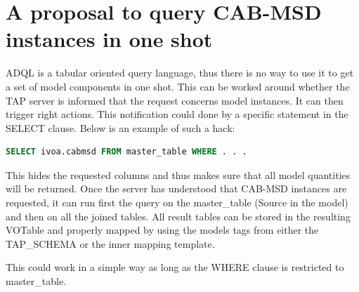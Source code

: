 \documentclass[11pt,a4paper]{ivoa}
\begin{document}
\section{A proposal to query CAB-MSD instances in one shot}
ADQL is a  tabular oriented query language, thus there is no way to use it to get a set of model components in one shot.
This can be worked around whether the TAP server is informed that the request concerns model instances. It can then trigger right actions.
This notification could done by a specific statement in the SELECT clause. Below is an example of such a hack:
\begin{lstlisting}[language=SQL]
SELECT ivoa.cabmsd FROM master_table WHERE . . . 
\end{lstlisting}
This hides the requested columns and thus makes sure that all model quantities will be returned.
Once the server has understood that CAB-MSD instances are requested, it can run first the query on the master\_table (Source in the model) and then on all the joined tables.
All result tables can be stored in the resulting VOTable and properly mapped by using the models tags from either the TAP\_SCHEMA or the inner mapping template.

This could work in a simple way as long as the WHERE clause is restricted to master\_table. 


\end{document}
